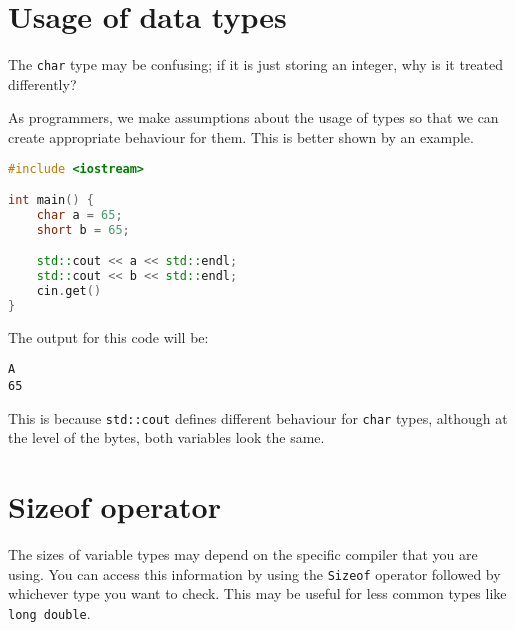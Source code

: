 \documentclass[12pt]{article}
\begin{document}
\section{Usage of data types}
The \verb$char$ type may be confusing; if it is just storing an integer, why is it treated differently?

As programmers, we make assumptions about the usage of types so that we can create appropriate behaviour 
for them. This is better shown by an example.

\begin{lstlisting}[language=C++]
#include <iostream>

int main() {
    char a = 65;
    short b = 65;

    std::cout << a << std::endl;
    std::cout << b << std::endl;
    cin.get()
}
\end{lstlisting}

The output for this code will be:
\begin{lstlisting}
A
65
\end{lstlisting}

This is because \verb$std::cout$ defines different behaviour for \verb$char$ types, although at the level of 
the bytes, both variables look the same.

\section{Sizeof operator}
The sizes of variable types may depend on the specific compiler that you are using. You can access this information
by using the \verb$Sizeof$ operator followed by whichever type you want to check. This may be useful for less common
types like \verb$long double$.
\end{document}
